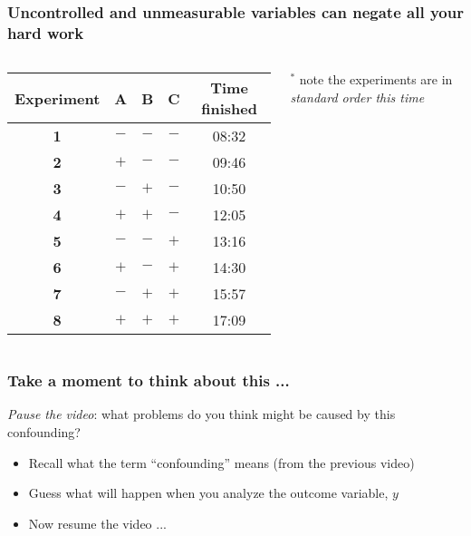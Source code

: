 \begin{frame}\frametitle{Uncontrolled and unmeasurable variables can negate all your hard work}
	

	\begin{columns}[T]
			
			\vspace{1cm}
			\begin{tabulary}{\linewidth}{ccccc}\hline 
				\textbf{\relax Experiment } & \textbf{\relax A } & \textbf{\relax B } & \textbf{\relax C } & \textbf{\relax Time finished} \\
				\hline 
				\textbf{1} & \(-\) & \(-\) & \(-\) & 08:32\\
				\textbf{2} & \(+\) & \(-\) & \(-\) & 09:46\\
				\textbf{3} & \(-\) & \(+\) & \(-\) & 10:50\\
				\textbf{4} & \(+\) & \(+\) & \(-\) & 12:05\\
				\textbf{5} & \(-\) & \(-\) & \(+\) & 13:16\\
				\textbf{6} & \(+\) & \(-\) & \(+\) & 14:30\\
				\textbf{7} & \(-\) & \(+\) & \(+\) & 15:57\\
				\textbf{8} & \(+\) & \(+\) & \(+\) & 17:09\\
				 \hline
			\end{tabulary}
			
			\vspace{0.2cm}
			{\scriptsize $^\ast$ note the experiments are in \emph{standard order this time}}

	\end{columns}	
\end{frame}

\begin{frame}\frametitle{Take a moment to think about this ...}
	\begin{exampleblock}{}
		\emph{Pause the video}: what problems do you think might be caused by this confounding?
		
		\vspace{1cm}
		\begin{itemize}
			\item	Recall what the term ``confounding'' means (from the previous video)
			\item	Guess what will happen when you analyze the outcome variable, $y$
			\item	Now resume the video ...
			
		\end{itemize}
	\end{exampleblock}
\end{frame}

